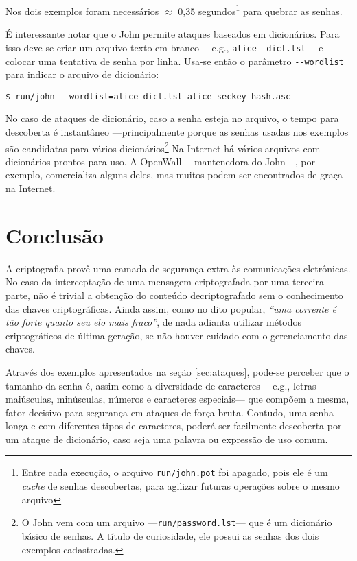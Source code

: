 \documentclass[12px,a4paper,twoside]{article}
\begin{document}
Nos dois exemplos foram necessários $\approx$ 0,35 segundos\footnote{Entre cada
execução, o arquivo \texttt{run/john.pot} foi apagado, pois ele é um
\textit{cache} de senhas descobertas, para agilizar futuras operações sobre o
mesmo arquivo} para quebrar as senhas.

É interessante notar que o John permite ataques baseados em dicionários.  Para
isso deve-se criar um arquivo texto em branco ---e.g., \texttt{alice-
dict.lst}--- e colocar uma tentativa de senha por linha.  Usa-se então o
parâmetro \texttt{-{}-wordlist} para indicar o arquivo de dicionário:

\begin{verbatim}
$ run/john --wordlist=alice-dict.lst alice-seckey-hash.asc
\end{verbatim}

No caso de ataques de dicionário, caso a senha esteja no arquivo, o tempo para
descoberta é instantâneo ---principalmente porque as senhas usadas nos exemplos
são candidatas para vários dicionários\footnote{O John vem com um arquivo
---\texttt{run/password.lst}--- que é um dicionário básico de senhas.  A título
de curiosidade, ele possui as senhas dos dois exemplos cadastradas.}  Na
Internet há vários arquivos com dicionários prontos para uso.  A OpenWall
---mantenedora do John---, por exemplo, comercializa alguns deles, mas muitos
podem ser encontrados de graça na Internet.


\section{Conclusão}
\label{sec:conclusao}
A criptografia provê uma camada de segurança extra às comunicações eletrônicas.
No caso da interceptação de uma mensagem criptografada por uma terceira parte,
não é trivial a obtenção do conteúdo decriptografado sem o conhecimento das
chaves criptográficas.  Ainda assim, como no dito popular, \textit{``uma
corrente é tão forte quanto seu elo mais fraco''}, de nada adianta utilizar
métodos criptográficos de última geração, se não houver cuidado com o
gerenciamento das chaves.

Através dos exemplos apresentados na seção \ref{sec:ataques}, pode-se perceber
que o tamanho da senha é, assim como a diversidade de caracteres ---e.g.,
letras maiúsculas, minúsculas, números e caracteres especiais--- que compõem a
mesma, fator decisivo para segurança em ataques de força bruta.  Contudo, uma
senha longa e com diferentes tipos de caracteres, poderá ser facilmente
descoberta por um ataque de dicionário, caso seja uma palavra ou expressão de
uso comum.
\end{document}
